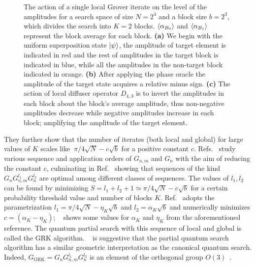 \begin{figure}[t!]
	\caption[The action of a single local Grover iterate on the level of the amplitudes for a search space of size ${N=2^4}$ and a block size ${b=2^{3}}$, which divides the search into ${K=2}$ blocks.]{The action of a single local Grover iterate on the level of the amplitudes for a search space of size ${N=2^4}$ and a block size ${b=2^{3}}$, which divides the search into ${K=2}$ blocks. $\ev{\alpha_{B_0}}$ and $\ev{\alpha_{B_1}}$ represent the block average for each block. \textbf{(a)} We begin with the uniform superposition state $\ket{\psi}$, the amplitude of target element is indicated in red and the rest of amplitudes in the target block is indicated in blue, while all the amplitudes in the non-target block indicated in orange. \textbf{(b)} After applying the phase oracle the amplitude of the target state acquires a relative minus sign. \textbf{(c)} The action of local diffuser operator $D_{4,3}$ is to invert the amplitudes in each block about the block's average amplitude, thus non-negative amplitudes decrease while negative amplitudes increase in each block; amplifying the amplitude of the target element.}
\end{figure}

\noindent
They further show that the number of iterates (both local and global) for large values of $K$ scales like $~\pi/4\sqrt{N} - c\sqrt{b}$ for a positive constant $c$. Refs.~\cite{Korepin_2005,Korepin_2006,Choi_2006,Korepin_2006a,Korepin_2006b} study various sequence and application orders of $G_{n,m}$ and $G_{n}$ with the aim of reducing the constant $c$, culminating in Ref.~\cite{Korepin_2006} showing that sequences of the kind $G_{n}G_{n,m}^{l_1}G_{n}^{l_2}$ are optimal among different classes of sequences. The values of $l_1,l_2$ can be found by minimizing $S = l_1 + l_2 + 1 \simeq \pi / 4 \sqrt{N} - c \sqrt{b}$ for a certain probability threshold value and number of blocks $K$. Ref.~\cite{Korepin_2005} adopts the parametrization $l_1 = \pi / 4 \sqrt{N} - \eta_K\sqrt{b}$ and $l_2 = \alpha_K\sqrt{b}$ and numerically minimizes $c = (\alpha_K - \eta_K)$; ~ shows some values for $\alpha_K$ and $\eta_K$ from the aforementioned reference. The quantum partial search with this sequence of local and global is called the \gls{GRK} algorithm. ~ is suggestive that the partial quantum search algorithm has a similar geometric interpretation as the canonical quantum search. Indeed, $G_{\text{GRK}} = G_{n}G_{n,m}^{l_1}G_{n}^{l_2}$ is an element of the orthogonal group $O(3)$~\cite{Korepin_2006b}.

